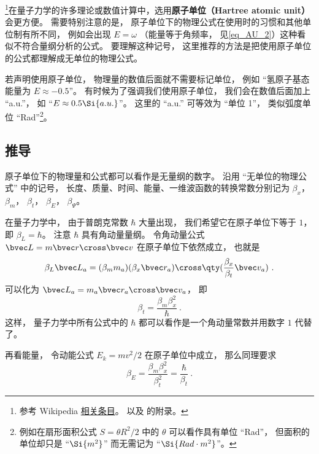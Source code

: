 

\footnote{参考 Wikipedia \href{https://en.wikipedia.org/wiki/Hartree_atomic_units}{相关条目}。 以及 \cite{Bransden} 的附录。}在量子力学的许多理论或数值计算中，选用\textbf{原子单位（Hartree atomic unit）}会更方便。 需要特别注意的是， 原子单位下的物理公式在使用时的习惯和其他单位制有所不同， 例如会出现 $E = \omega$ （能量等于角频率， 见\autoref{eq_AU_2}）这种看似不符合量纲分析的公式。 要理解这种记号， 这里推荐的方法是把使用原子单位的公式都理解成无单位的物理公式。


若声明使用原子单位， 物理量的数值后面就不需要标记单位， 例如 “氢原子基态能量为 $E \approx -0.5$”。 有时候为了强调我们使用原子单位， 我们会在数值后面加上 “a.u.”， 如 “$E \approx 0.5 \Si{a.u.}$”。 这里的 “a.u.” 可等效为 “单位 1”， 类似弧度单位 “Rad”\footnote{例如在扇形面积公式 $S = \theta R^2/2$ 中的 $\theta$ 可以看作具有单位 “Rad”， 但面积的单位却只是 “$\Si{m^2}$” 而无需记为 “$\Si{Rad\cdot m^2}$”。}。

\subsection{推导}\label{sub_AU_1}
原子单位下的物理量和公式都可以看作是无量纲的数字。 沿用 “无单位的物理公式” 中的记号， 长度、质量、时间、能量、一维波函数的转换常数分别记为 $\beta_x$， $\beta_m$， $\beta_t$， $\beta_E$， $\beta_\Psi$。

在量子力学中， 由于普朗克常数 $\hbar$ 大量出现， 我们希望它在原子单位下等于 $1$， 即 $\beta_L = \hbar$。 注意 $\hbar$ 具有角动量量纲。 令角动量公式 $\bvec L = m \bvec r \cross \bvec v$ 在原子单位下依然成立， 也就是
\begin{equation}
\beta_L\bvec L_a = (\beta_m m_a) (\beta_x \bvec r_a) \cross \qty(\frac{\beta_x}{\beta_t} \bvec v_a)~.
\end{equation}
可以化为 $\bvec L_a = m_a \bvec r_a \cross \bvec v_a$， 即
\begin{equation}\label{eq_AU_6}
\beta_t = \frac{\beta_m \beta_x^2}{\hbar}~.
\end{equation}
这样， 量子力学中所有公式中的 $\hbar$ 都可以看作是一个角动量常数并用数字 $1$ 代替了。

再看能量， 令动能公式 $E_k = mv^2/2$ 在原子单位中成立， 那么同理要求
\begin{equation}\label{eq_AU_7}
\beta_E = \frac{\beta_m \beta_x^2}{\beta_t^2} = \frac{\hbar}{\beta_t}~.
\end{equation}


